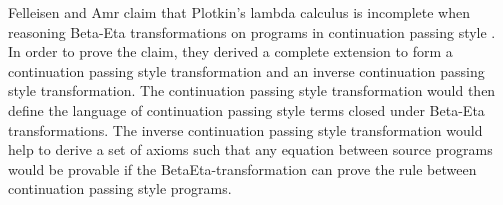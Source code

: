 
\usepackage{algorithm}
\usepackage{listings}
\usepackage{graphicx,amssymb,amsmath}
\usepackage{epstopdf}
\usepackage{setspace}
\sloppy

\oddsidemargin 0in
\evensidemargin 0in
\textwidth 6.5in
\topmargin -0.5in
\textheight 9.0in



\def \cps {continuation passing style }


\pagestyle{myheadings}  %
	 	
\doublespacing
Felleisen and Amr claim that Plotkin's lambda calculus is incomplete when reasoning Beta-Eta transformations on programs in \cps.  In order to prove the claim, they derived a complete extension to form a \cps transformation and an inverse \cps transformation.  The \cps transformation would then define the language of \cps terms closed under Beta-Eta transformations.  The inverse \cps transformation would help to derive a set of axioms such that any equation between source programs would be provable if the BetaEta-transformation can prove the rule between \cps programs.


